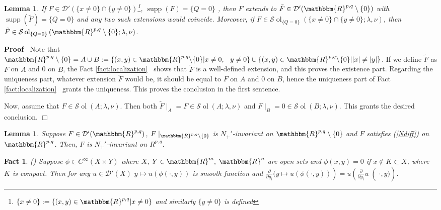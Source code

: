 \documentclass[12pt]{article}
\newcommand{\assign}{:=}
\newcommand{\nin}{\not\in}
\newcommand{\tmop}[1]{\ensuremath{\operatorname{#1}}}
\renewenvironment{proof}{\noindent\textbf{Proof\ }}{\hspace*{\fill}$\Box$\medskip}
\newtheorem{lemma}[proposition]{Lemma}
\newtheorem{fact}[proposition]{Fact}
\theoremstyle{remark}
\newcommand{\D}{\mathcal{D}}
\newcommand{\supp}{\tmop{supp}}
\newcommand{\proofexplanation}[1]{(#1)}
\newcommand{\R}{\mathbbm{R}}
\begin{document}
\begin{lemma}
  \label{lem:sing-q-3}If $F \in \D' (\{ x \neq 0 \} \cap \{ y \neq 0
  \})$\footnote{$\{ x \neq 0 \} \assign \{ (x, y) \in \mathbbm{R}^{p, q} | x
  \neq 0 \}$ and similarly $\{ y \neq 0 \}$ is defined}, $\supp (F) = \{ Q = 0
  \}$ , then $F$ extends to $\tilde{F} \in \D' (\R^{p, q} \setminus \{ 0 \})$
  with $\supp (\tilde{F}) = \{ Q = 0 \}$ and any two such extensions would
  coincide. Moreover, if $F \in \mathcal{S} \tmop{ol}_{\{ Q = 0 \}} (\{ x \neq
  0 \} \cap \{ y \neq 0 \} ; \lambda, \nu)$, then $\tilde{F} \in \mathcal{S}
  \tmop{ol}_{\{ Q = 0 \}} \left( \R^{p, q} \setminus \{ 0 \} ; \lambda, \nu
  \right)$.
\end{lemma}

\begin{proof}
  Note that $\R^{p, q} \setminus \{ 0 \} = A \cup B \assign \{ (x, y) \in
  \R^{p, q} \backslash \{ 0 \} |x \neq 0, \hspace{0.75em} y \neq 0\} \cup \{
  (x, y) \in \R^{p, q} \backslash \{ 0 \} | | x | \neq | y | \}$. If we define
  $\tilde{F}$ as $F$ on $A$ and 0 on $B$, the Fact \ref{fact:localization} \
  shows that $\tilde{F}$ is a well-defined extension, and this proves the
  existence part. Regarding the uniqueness part, whatever extension
  $\tilde{F}$ would be, it should be equal to $F$ on $A$ and 0 on $B$, hence
  the uniqueness part of Fact \ref{fact:localization} \ grants the uniqueness.
  This proves the conclusion in the first sentence.
  
  Now, assume that $F \in \mathcal{S} \tmop{ol} (A ; \lambda, \nu)$. Then both
  $\tilde{F} \mid_A = F \in \mathcal{S} \tmop{ol} (A ; \lambda, \nu)$ and
  $F \mid_B = 0 \in \mathcal{S} \tmop{ol} (B ; \lambda, \nu)$. This grants
  the desired conclusion.
\end{proof}

\begin{lemma}
  \label{supp-Q:lem-sing-q-4}Suppose $F \in \D' (\R^{p, q})$, $F
  \mid_{\R^{p, q} \setminus \{ 0 \}}$ is $N_+'$-invariant on $\R^{p, q}
  \setminus \{ 0 \}$ and $F$ satisfies (\ref{Ndiff}) on $\R^{p, q}$. Then, $F$
  is $N_+'$-invariant on $R^{p, q}$.
\end{lemma}

\begin{fact}
\label{fact:sing-q-2}{\proofexplanation{{\cite[Thm
2.1.3]{hormander1983analysis}}}} Suppose $\phi \in C^{\infty}  (X \times Y)$
where $X, \hspace{0.25em} Y \in \R^m, \hspace{0.25em} \R^n$ are open sets and
$\phi (x, y) = 0$ if $x \nin K \subset X$, where $K$ is compact. Then for any
$u \in \D' (X)$ $y \mapsto u (\phi (\cdot, y))$ is smooth function and $\left.
\left. \frac{\partial}{\partial y_i}  (y \mapsto u (\phi (\cdot, y)) \right) =
u \left( \frac{\partial}{\partial y_i} u \right( \cdot, y)
\right)$.
\end{fact}
\end{document}
